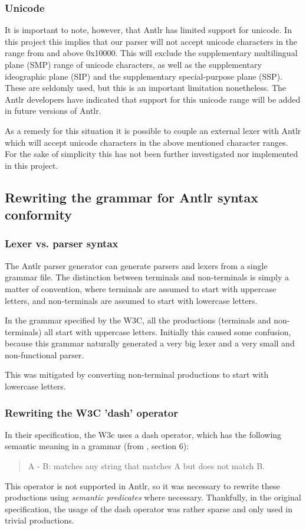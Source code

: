 \subsubsection{Unicode}
It is important to note, however, that Antlr has limited support for unicode.
In this project this implies that our parser will not accept unicode characters
in the range from and above 0x10000. This will exclude the supplementary
multilingual plane (SMP) range of unicode characters, as well as the
supplementary ideographic plane (SIP) and the supplementary special-purpose
plane (SSP). These are seldomly used, but this is an important limitation
nonetheless. The Antlr developers have indicated that support for this unicode
range will be added in future versions of Antlr.

As a remedy for this situation it is possible to couple an external lexer with
Antlr which will accept unicode characters in the above mentioned character
ranges. For the sake of simplicity this has not been further investigated nor
implemented in this project.

\subsection{Rewriting the grammar for Antlr syntax conformity}
\subsubsection{Lexer vs. parser syntax}
The Antlr parser generator can generate parsers and lexers from a single grammar
file. The distinction between terminals and non-terminals is simply a matter of
convention, where terminals are assumed to start with uppercase letters, and
non-terminals are assumed to start with lowercase letters.

In the grammar specified by the W3C, all the productions (terminals and
non-terminals) all start with uppercase letters. Initially this caused some
confusion, because this grammar naturally generated a very big lexer and a very
small and non-functional parser.

This was mitigated by converting non-terminal productions to start with
lowercase letters.

\subsubsection{Rewriting the W3C 'dash' operator}
In their specification, the W3c uses a dash operator, which has the following
semantic meaning in a grammar (from \cite{w3c03}, section 6):
\begin{quote}
A - B: matches any string that matches A but does not match B.
\end{quote}
This operator is not supported in Antlr, so it was necessary to rewrite
these productions using \emph{semantic predicates} where necessary. Thankfully,
in the original specification, the usage of the dash operator was rather sparse
and only used in trivial productions.

